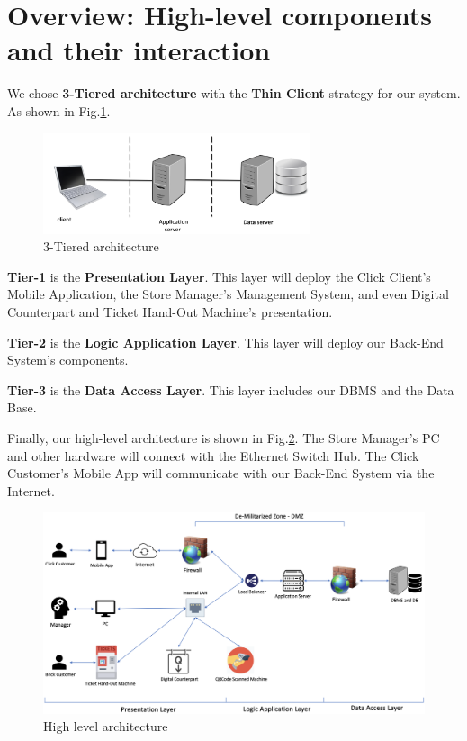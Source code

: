 \documentclass[a4paper,12pt]{report}
\begin{document}
\section{Overview: High-level components and their interaction}\label{sec:ArchitectureOverview}

We chose \textbf{3-Tiered architecture} with the \textbf{Thin Client} strategy for our system.
As shown in Fig.\ref{fig:ThreeTieredArchitecture}.\cite{SistemiInformativi}

\begin{figure}[H]
	\centering
	\includegraphics[width=0.7\textwidth]{ThreeTiered}
	\caption{3-Tiered architecture}
	\centering
	\label{fig:ThreeTieredArchitecture}
\end{figure}


\textbf{Tier-1} is the \textbf{Presentation Layer}.
This layer will deploy the Click Client's Mobile Application,
the Store Manager's Management System,
and even Digital Counterpart and Ticket Hand-Out Machine's presentation.

\textbf{Tier-2} is the \textbf{Logic Application Layer}.
This layer will deploy our Back-End System's components.

\textbf{Tier-3} is the \textbf{Data Access Layer}.
This layer includes our DBMS and the Data Base.

Finally, our high-level architecture is shown in Fig.\ref{fig:HighLevelArchitecture}.
The Store Manager's PC and other hardware will connect with the Ethernet Switch Hub.
The Click Customer's Mobile App will communicate with our Back-End System via the Internet.

\begin{figure}[H]
	\centering
	\includegraphics[width=1.2\textwidth]{HighLevelArchitecture}
	\caption{High level architecture}
	\centering
	\label{fig:HighLevelArchitecture}
\end{figure}
\end{document}
